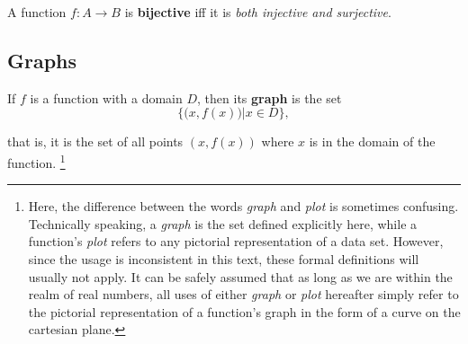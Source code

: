   \begin{defn}
    A function \(f:A \to B\) is \textbf{bijective} iff it is \emph{both injective and surjective}.
  \end{defn}
\begin{figure}[H]
    \begin{center}
        \hspace{0.2in}%
    \end{center}
  \end{figure}


\subsection{Graphs} 

\begin{defn}
  If \(f\) is a function with a domain \(D\), then its \textbf{graph} is the set
  \[ \Big\{ \big( x,f(x) \big) \Big | x \in D \Big\},\]
\end{defn}
that is, it is the set of all points $(x, f(x))$ where $x$ is in the domain of the function.%
\footnote{Here, the difference between the words \emph{graph} and \emph{plot} is sometimes confusing. Technically speaking, a \emph{graph} is the set defined explicitly here, while a function's \emph{plot} refers to any pictorial representation of a data set. However, since the usage is inconsistent in this text, these formal definitions will usually not apply. It can be safely assumed that as long as we are within the realm of real numbers, all uses of either \emph{graph} or \emph{plot} hereafter simply refer to the pictorial representation of a function's graph in the form of a curve on the cartesian plane.}

